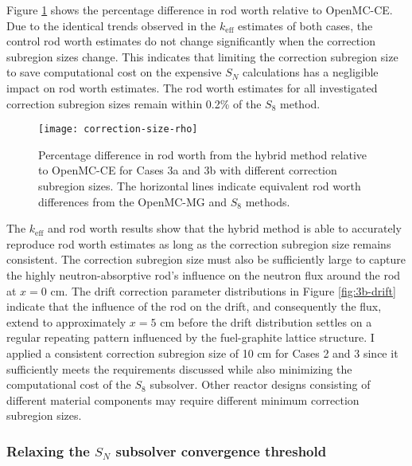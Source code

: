 Figure \ref{fig:v1-size-rho} shows the percentage difference in rod worth relative to OpenMC-CE. 
Due to the identical trends observed in the $k_\text{eff}$ estimates of both cases, the control rod
worth estimates do not change significantly when the correction subregion
sizes change. This indicates that limiting the correction subregion size to save
computational cost on the expensive $S_N$ calculations has a negligible impact on rod worth
estimates. The rod worth estimates for all investigated correction subregion sizes remain within
0.2\% of the $S_8$ method.

\begin{figure}[htb!]
  \centering
  \texttt{[image: correction-size-rho]}
  \caption{Percentage difference in rod worth from the hybrid method relative to OpenMC-CE for
    Cases 3a and 3b with different correction subregion sizes. The horizontal lines indicate
    equivalent rod worth differences from the OpenMC-MG and $S_8$ methods.}
  \label{fig:v1-size-rho}
\end{figure}

The $k_\text{eff}$ and rod worth results show that the hybrid method is able to accurately
reproduce rod worth estimates as long as the correction subregion size remains consistent. The
correction subregion size must also be sufficiently large to capture the highly neutron-absorptive
rod's influence on the neutron flux around the rod at $x=0$ cm. The drift correction parameter
distributions in Figure \ref{fig:3b-drift} indicate that the influence of the rod on the drift, and
consequently the flux, extend to approximately $x=5$ cm before the drift distribution settles on a
regular repeating pattern influenced by the fuel-graphite lattice structure. I applied a consistent
correction subregion size of 10 cm for Cases 2 and 3 since it sufficiently meets the requirements
discussed while also minimizing the computational cost of the $S_8$ subsolver. Other reactor
designs consisting of different material components may require different minimum correction
subregion sizes.

\subsubsection{Relaxing the $S_N$ subsolver convergence threshold}


